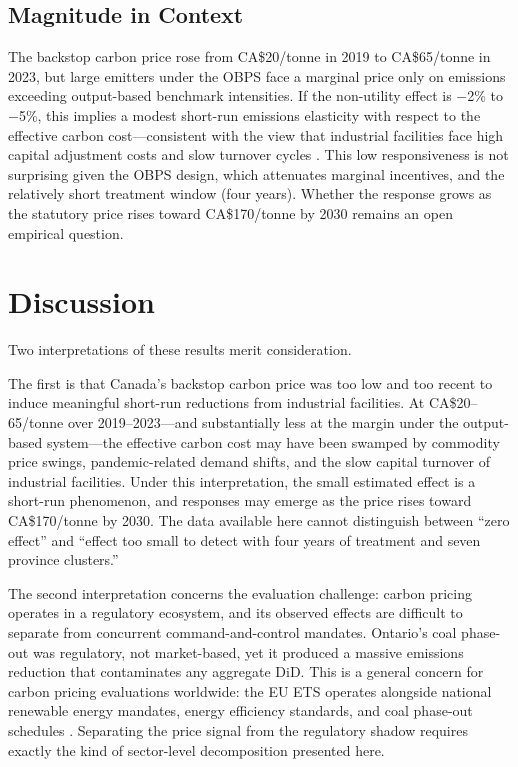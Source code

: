 \documentclass[12pt]{article}
\begin{document}
\subsection{Magnitude in Context}

The backstop carbon price rose from CA\$20/tonne in 2019 to CA\$65/tonne in 2023, but large emitters under the OBPS face a marginal price only on emissions exceeding output-based benchmark intensities. If the non-utility effect is $-$2\% to $-$5\%, this implies a modest short-run emissions elasticity with respect to the effective carbon cost---consistent with the view that industrial facilities face high capital adjustment costs and slow turnover cycles \citep{goulder_hafstead_2018}. This low responsiveness is not surprising given the OBPS design, which attenuates marginal incentives, and the relatively short treatment window (four years). Whether the response grows as the statutory price rises toward CA\$170/tonne by 2030 remains an open empirical question.


\section{Discussion}

Two interpretations of these results merit consideration.

The first is that Canada's backstop carbon price was too low and too recent to induce meaningful short-run reductions from industrial facilities. At CA\$20--65/tonne over 2019--2023---and substantially less at the margin under the output-based system---the effective carbon cost may have been swamped by commodity price swings, pandemic-related demand shifts, and the slow capital turnover of industrial facilities. Under this interpretation, the small estimated effect is a short-run phenomenon, and responses may emerge as the price rises toward CA\$170/tonne by 2030. The data available here cannot distinguish between ``zero effect'' and ``effect too small to detect with four years of treatment and seven province clusters.''

The second interpretation concerns the evaluation challenge: carbon pricing operates in a regulatory ecosystem, and its observed effects are difficult to separate from concurrent command-and-control mandates. Ontario's coal phase-out was regulatory, not market-based, yet it produced a massive emissions reduction that contaminates any aggregate DiD. This is a general concern for carbon pricing evaluations worldwide: the EU ETS operates alongside national renewable energy mandates, energy efficiency standards, and coal phase-out schedules \citep{martin_muuls_wagner_2016}. Separating the price signal from the regulatory shadow requires exactly the kind of sector-level decomposition presented here.
\end{document}
